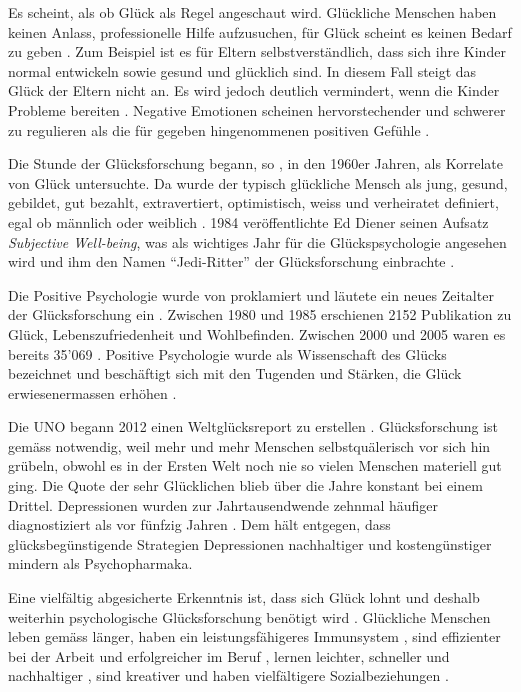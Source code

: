 Es scheint, als ob Glück als Regel angeschaut wird. Glückliche Menschen haben keinen Anlass, professionelle Hilfe aufzusuchen, für Glück scheint es keinen Bedarf zu geben \cite[S.~14]{Veenhoven1991}. Zum Beispiel ist es für Eltern selbstverständlich, dass sich ihre Kinder normal entwickeln sowie gesund und glücklich sind. In diesem Fall steigt das Glück der Eltern nicht an. Es wird jedoch deutlich vermindert, wenn die Kinder Probleme bereiten \cite{Fingerman2012}. Negative Emotionen scheinen hervorstechender und schwerer zu regulieren als die für gegeben hingenommenen positiven Gefühle \cite{Charles2010}. 

Die Stunde der Glücksforschung begann, so , in den 1960er Jahren, als  Korrelate von Glück untersuchte. Da wurde der typisch glückliche Mensch als jung, gesund, gebildet, gut bezahlt, extravertiert, optimistisch, weiss und verheiratet definiert, egal ob männlich oder weiblich \cite{Bucher2009}. 1984 veröffentlichte Ed Diener \cite{Diener1984} seinen Aufsatz \textit{Subjective Well-being}, was als wichtiges Jahr für die Glückspsychologie angesehen wird und ihm den Namen \enquote{Jedi-Ritter} der Glücksforschung einbrachte \cite{Metzger2010}.

Die Positive Psychologie wurde von  proklamiert und läutete ein neues Zeitalter der Glücksforschung ein \cite{Bucher2009}. Zwischen 1980 und 1985 erschienen 2152 Publikation zu Glück, Lebenszufriedenheit und Wohlbefinden. Zwischen 2000 und 2005 waren es bereits 35'069 \cite{Donaldson2014}. Positive Psychologie wurde als Wissenschaft des Glücks bezeichnet \cite{Carr2011} und beschäftigt sich mit den Tugenden und Stärken, die Glück erwiesenermassen erhöhen \cite{Peterson2004}.

Die UNO begann 2012 einen Weltglücksreport zu erstellen \cite{Helliwell2013}. Glücksforschung ist gemäss  notwendig, weil mehr und mehr Menschen selbstquälerisch vor sich hin grübeln, obwohl es in der Ersten Welt noch nie so vielen Menschen materiell gut ging. Die Quote der sehr Glücklichen blieb über die Jahre konstant bei einem Drittel. Depressionen wurden zur Jahrtausendwende zehnmal häufiger diagnostiziert als vor fünfzig Jahren \cite{Seligman2009}. Dem hält  entgegen, dass glücksbegünstigende Strategien Depressionen nachhaltiger und kostengünstiger mindern als Psychopharmaka.

Eine vielfältig abgesicherte Erkenntnis ist, dass sich Glück lohnt und deshalb weiterhin psychologische Glücksforschung benötigt wird \cite{Lyubomirsky2005}. Glückliche Menschen leben gemäss  länger, haben ein leistungsfähigeres Immunsystem \cite{Barak2006}, sind effizienter bei der Arbeit und erfolgreicher im Beruf \cite{Achor2010}, lernen leichter, schneller und nachhaltiger \cite{Endres2014}, sind kreativer \cite{Baas2008} und haben vielfältigere Sozialbeziehungen \cite{Rodriguez2014}.


